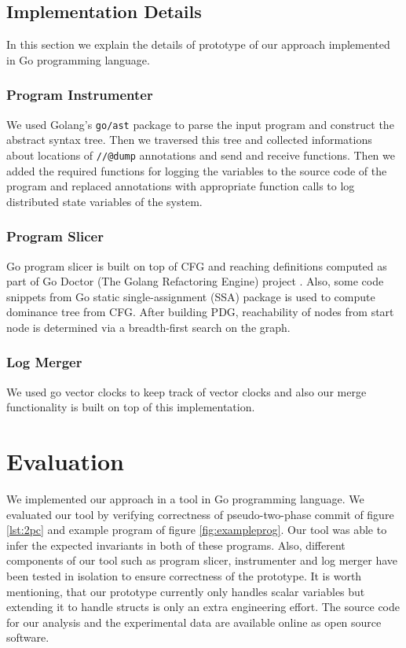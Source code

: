\subsection{Implementation Details}

In this section we explain the details of prototype of our approach implemented in Go programming language.

\subsubsection{Program Instrumenter}

We used Golang's \texttt{go/ast} package to parse the input program and construct the abstract syntax tree. Then we traversed this tree and collected informations about locations of \texttt{//@dump} annotations and send and receive functions. Then we added the required functions for logging the variables to the source code of the program and replaced annotations with appropriate function calls to log distributed state variables of the system. 

\subsubsection{Program Slicer}

Go program slicer is built on top of CFG and reaching definitions computed as part of Go Doctor (The Golang Refactoring Engine) project \cite{godoctor}. Also, some code snippets from Go static single-assignment (SSA) package \cite{ssa} is used to compute dominance tree from CFG. After building PDG, reachability of nodes from start node is determined via a breadth-first search on the graph.

\subsubsection{Log Merger}

We used go vector clocks \cite{vclock} to keep track of vector clocks and also our merge functionality is built on top of this implementation. 


\section{Evaluation}
We implemented our approach in a tool in Go programming language. We evaluated our tool by verifying correctness of pseudo-two-phase commit of figure \ref{lst:2pc} and example program of figure \ref{fig:exampleprog}. Our tool was able to infer the expected invariants in both of these programs. Also, different components of our tool such as program slicer, instrumenter and log merger have been tested in isolation to ensure correctness of the prototype. It is worth mentioning, that our prototype currently only handles scalar variables but extending it to handle structs is only an extra engineering effort. The source code for our analysis and the experimental data are available online\cite{distproject} as open source software.


